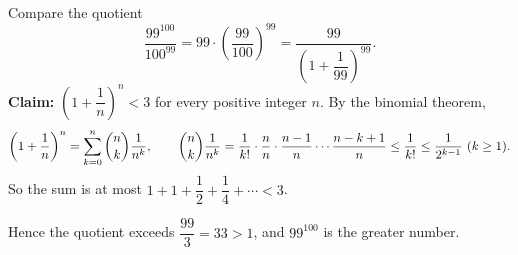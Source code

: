 Compare the quotient
\[
\dfrac{99^{100}}{100^{99}}=99\cdot\left(\dfrac{99}{100}\right)^{99}=\dfrac{99}{\left(1+\dfrac{1}{99}\right)^{99}} .
\]
\textbf{Claim:} $\left(1+\dfrac{1}{n}\right)^n<3$ for every positive integer $n$. By the binomial theorem,
\[
\left(1+\dfrac{1}{n}\right)^n=\sum_{k=0}^{n}\dbinom nk\dfrac{1}{n^k},\qquad \dbinom nk\dfrac{1}{n^k}=\dfrac{1}{k!}\cdot\dfrac{n}{n}\cdot\dfrac{n-1}{n}\cdots\dfrac{n-k+1}{n}\le\dfrac{1}{k!}\le\dfrac{1}{2^{k-1}}\ (k\ge1).
\]
So the sum is at most $1+1+\dfrac{1}{2}+\dfrac{1}{4}+\cdots<3$.

Hence the quotient exceeds $\dfrac{99}{3}=33>1$, and $\boxed{99^{100}}$ is the greater number.
